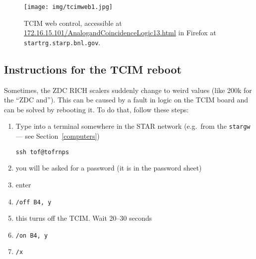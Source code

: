 \begin{figure}[htb]
  \begin{center}
    \texttt{[image: img/tcimweb1.jpg]}
  \end{center}
  \caption{TCIM web control, accessible at \url{172.16.15.101/AnalogandCoincidenceLogic13.html} in Firefox at \texttt{startrg.starp.bnl.gov}.}
\label{tcimweb}
\end{figure}


\subsection{Instructions for the TCIM reboot}
Sometimes, the ZDC RICH scalers suddenly change to weird values (like 200k for the ``ZDC and''). This can be caused by a fault in logic on the TCIM board and can be solved by rebooting it.
To do that, follow these steps:


\begin{enumerate}
\item Type into a terminal somewhere in the STAR network (e.g.\ from the \texttt{stargw} --- see Section~\ref{computers})
\begin{verbatim}
ssh tof@tofrnps
\end{verbatim}
\item you will be asked for a password (it is in the password sheet)
\item enter
\item \verb=/off B4, y=
\item this turns off the TCIM\@. Wait 20--30 seconds
\item \verb=/on B4, y=
\item \verb=/x=
\end{enumerate}


